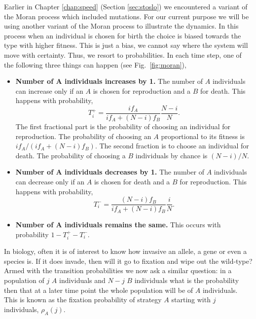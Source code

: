 \documentclass[oneside,11pt,a4paper]{book}
\begin{document}
Earlier in Chapter \ref{chap:speed} (Section \ref{sec:stoslo}) we encountered a variant of the Moran process which included mutations.
For our current purpose we will be using another variant of the Moran process to illustrate the dynamics.
In this process when an individual is chosen for birth the choice is biased towards the type with higher fitness.
This is just a bias, we cannot say where the system will move with certainty.
Thus, we resort to probabilities.
In each time step, one of the following three things can happen (see Fig.\ \ref{fig:moran}),
%
\begin{itemize}
\item \textbf{Number of $\mathbf{A}$ individuals increases by 1.}
The number of $A$ individuals can increase only if an $A$ is chosen for reproduction and a $B$ for death.
This happens with probability,
%
\begin{equation}
T_i^+ = \frac{i f_A}{i f_A + (N-i) f_B} \frac{N-i}{N}.
\end{equation}
%
The first fractional part is the probability of choosing an individual for reproduction.
The probability of choosing an $A$ proportional to its fitness is $i f_A/(i f_A + (N-i) f_B)$.
The second fraction is to choose an individual for death. The probability of choosing a $B$ individuals by chance is $(N-i)/N$.
\item \textbf{Number of $\mathbf{A}$ individuals decreases by 1.}
The number of $A$ individuals can decrease only if an $A$ is chosen for death and a $B$ for reproduction.
This happens with probability,
%
\begin{equation}
T_i^- = \frac{(N-i) f_B}{i f_A + (N-i) f_B} \frac{i}{N}.
\end{equation}
%
\item \textbf{Number of $\mathbf{A}$ individuals remains the same.}
This occurs with probability $1-T_i^+ - T_i^-$.
\end{itemize}
%
In biology, often it is of interest to know how invasive an allele, a gene or even a species is.
If it does invade, then will it go to fixation and wipe out the wild-type?
Armed with the transition probabilities we now ask a similar question:
in a population of $j$ $A$ individuals and $N-j$ $B$ individuals 
what is the probability then that at a later time point the whole population will be of $A$ individuals.
This is known as the fixation probability of strategy $A$ starting with $j$ individuals, $\rho_A (j)$.
\end{document}
